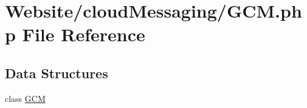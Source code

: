 \hypertarget{_g_c_m_8php}{\section{Website/cloud\-Messaging/\-G\-C\-M.php File Reference}
\label{_g_c_m_8php}
}
\subsection*{Data Structures}
\begin{DoxyCompactItemize}
\item 
class \hyperlink{class_g_c_m}{G\-C\-M}
\end{DoxyCompactItemize}
